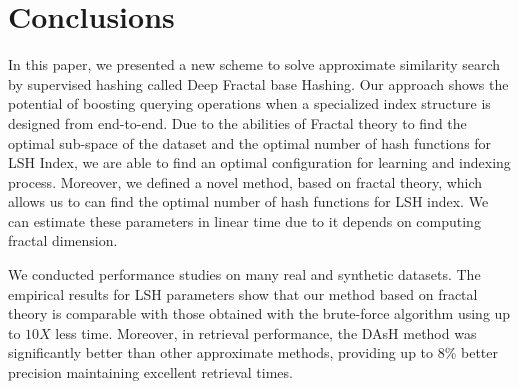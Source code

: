 \documentclass{article}
\begin{document}
\section{Conclusions}

In this paper, we presented a new scheme to solve approximate similarity search by supervised hashing called Deep Fractal base Hashing.  Our approach shows the potential of boosting querying operations when a specialized index structure is designed from end-to-end.  Due to the abilities of Fractal theory to find the optimal sub-space of the dataset and the optimal number of hash functions for LSH Index, we are able to find an optimal configuration for learning and indexing process.  Moreover, we defined a novel method, based on fractal theory, which allows us to can find the optimal number of hash functions for  LSH index. We can estimate these parameters in linear time due to it depends on computing fractal dimension. 

We conducted performance studies on many real and synthetic datasets.  The empirical results for LSH parameters show that our method based on fractal theory is comparable with those obtained with the brute-force algorithm using up to $10X$ less time. Moreover, in retrieval performance, the DAsH method was significantly better than other approximate methods, providing up to 8\%  better precision maintaining excellent retrieval times.  %






\end{document}
